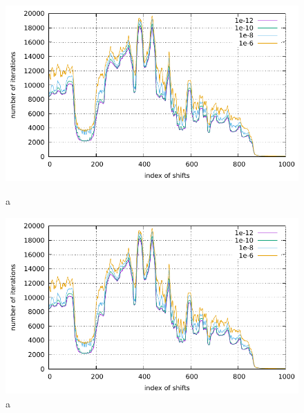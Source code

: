 

\begin{figure}[H]
	\begin{center}
		\begin{minipage}[t]{0.49\columnwidth}
			\centering
			\includegraphics[scale=1.5]{./fig/compare-inner.pdf}
			\caption{a}
			\label{fig-1}
		\end{minipage}
		\begin{minipage}[t]{0.49\columnwidth}
			\centering
			\includegraphics[scale=1.5]{./fig/compare-inner.pdf}
			\caption{a}
			\label{fig-2}
		\end{minipage}
	\end{center}
\end{figure}



